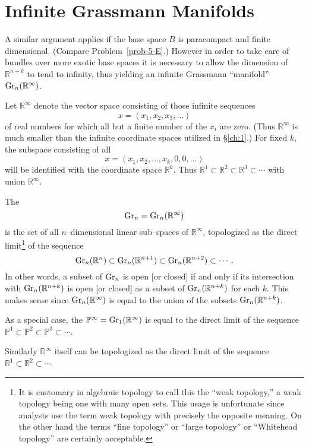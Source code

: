 \documentclass[../main]{subfiles}
\begin{document}
\section{Infinite Grassmann Manifolds}\label{sec:5.1}
A similar argument applies if the base space $B$ is paracompact and finite dimensional. (Compare Problem~\ref{prob-5-E}.) However in order to take care of bundles over more exotic base spaces it is necessary to allow the dimension of ${\mathbb R}^{n + k}$ to tend to infinity, thus yielding an infinite Grassmann ``manifold'' $\operatorname{Gr}_n({\mathbb R}^\infty)$. 

Let ${\mathbb R}^\infty$ denote the vector space consisting of those infinite sequences \[x = (x_1, x_2, x_3, \ldots)\] of real numbers for which all but a finite number of the $x_i$ are zero. (Thus ${\mathbb R}^\infty$ is much smaller than the infinite coordinate spaces utilized in \S\ref{ch:1}.) For fixed $k$, the subspace consisting of all \[x = (x_1, x_2, \ldots, x_k, 0, 0, \ldots)\] will be identified with the coordinate space ${\mathbb R}^k$. Thus ${\mathbb R}^1 \subset {\mathbb R}^2 \subset {\mathbb R}^3 \subset \cdots$ with union ${\mathbb R}^\infty$. 

\begin{definition}
The  \[\operatorname{Gr}_n = \operatorname{Gr}_n({\mathbb R}^\infty)\] is the set of all $n$--dimensional linear sub--spaces of ${\mathbb R}^\infty$, topologized as the direct limit\footnote{It is customary in algebraic topology to call this the ``weak topology,'' a weak topology being one with many open sets. This usage is unfortunate since analysts use the term weak topology with precisely the opposite meaning. On the other hand the terms ``fine topology'' or ``large topology'' or ``Whitehead topology'' are certainly acceptable.} of the sequence \[\operatorname{Gr}_n({\mathbb R}^n) \subset \operatorname{Gr}_n({\mathbb R}^{n + 1}) \subset \operatorname{Gr}_n({\mathbb R}^{n + 2}) \subset \cdots.\] In other words, a subset of $\operatorname{Gr}_n$ is open [or closed] if and only if its intersection with $\operatorname{Gr}_n({\mathbb R}^{n + k})$ is open [or closed] as a subset of $\operatorname{Gr}_n({\mathbb R}^{n + k})$ for each $k$. This makes sense since $\operatorname{Gr}_n({\mathbb R}^\infty)$ is equal to the union of the subsets $\operatorname{Gr}_n({\mathbb R}^{n + k})$. 
\end{definition}

As a special case, the  ${\mathbb P}^\infty = \operatorname{Gr}_1({\mathbb R}^\infty)$ is equal to the direct limit of the sequence ${\mathbb P}^1 \subset {\mathbb P}^2 \subset {\mathbb P}^3 \subset \cdots$.

Similarly ${\mathbb R}^\infty$ itself can be topologized as the direct limit of the sequence ${\mathbb R}^1 \subset {\mathbb R}^2 \subset \cdots$. 
\end{document}
